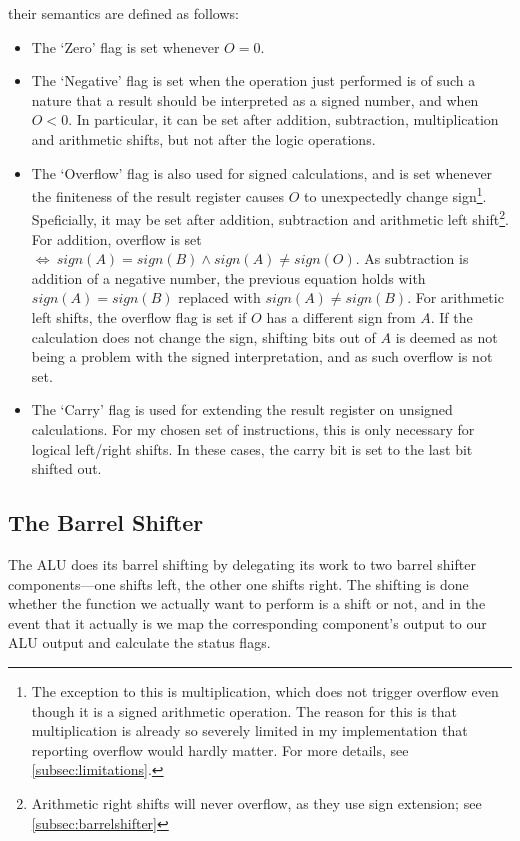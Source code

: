 \documentclass{article}
\begin{document}
their semantics are defined as follows:
\begin{itemize}
\item The `Zero' flag is set whenever $O = 0$.
\item The `Negative' flag is set when the operation just performed is of such a nature that a result should be interpreted as a signed number, and when $O < 0$. In particular, it can be set after addition, subtraction, multiplication and arithmetic shifts, but not after the logic operations.
\item The `Overflow' flag is also used for signed calculations, and is set whenever the finiteness of the result register causes $O$ to unexpectedly change sign\footnote{The exception to this is multiplication, which does not trigger overflow even though it is a signed arithmetic operation. The reason for this is that multiplication is already so severely limited in my implementation that reporting overflow would hardly matter. For more details, see \autoref{subsec:limitations}.}. Speficially, it may be set after addition, subtraction and arithmetic left shift\footnote{Arithmetic right shifts will never overflow, as they use sign extension; see \autoref{subsec:barrelshifter}}. For addition, overflow is set~$\iff~sign(A)=sign(B)\wedge{}sign(A)\neq{}sign(O)$. As subtraction is addition of a negative number, the previous equation holds with $sign(A)=sign(B)$ replaced with $sign(A)\neq{}sign(B)$. For arithmetic left shifts, the overflow flag is set if $O$ has a different sign from $A$. If the calculation does not change the sign, shifting bits out of $A$ is deemed as not being a problem with the signed interpretation, and as such overflow is not set.
\item The `Carry' flag is used for extending the result register on unsigned calculations. For my chosen set of instructions, this is only necessary for logical left/right shifts. In these cases, the carry bit is set to the last bit shifted out.
\end{itemize}

\subsection{The Barrel Shifter}
\label{subsec:barrelshifter}
The ALU does its barrel shifting by delegating its work to two barrel shifter components---one shifts left, the other one shifts right. The shifting is done whether the function we actually want to perform is a shift or not, and in the event that it actually is we map the corresponding component's output to our ALU output and calculate the status flags. 
\end{document}
